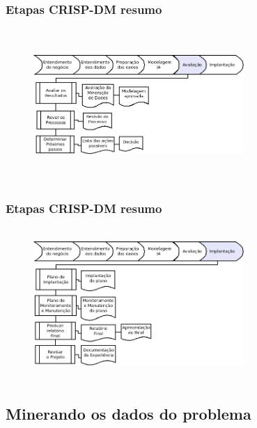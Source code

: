 \documentclass[11pt]{beamer}
\begin{document}
\begin{frame}\frametitle{ Etapas CRISP-DM resumo}
	\transdissolve[duration=1, direction=25]
	\begin{figure}[!ht]
		\includegraphics[width=80mm, height=58mm]{Figuras/Crisp/Avaliacao.png}
	\end{figure}
\end{frame}

\begin{frame}\frametitle{ Etapas CRISP-DM resumo}
	\transdissolve[duration=1, direction=25]
	\begin{figure}[!ht]
		\includegraphics[width=80mm, height=58mm]{Figuras/Crisp/Implantacao.png}
	\end{figure}
\end{frame}

\subsection{ Minerando os dados do problema}
\end{document}
